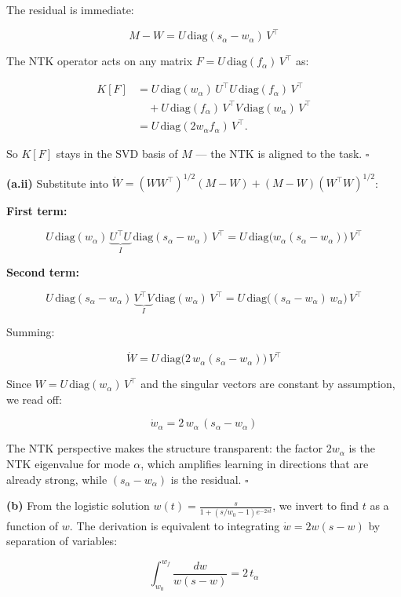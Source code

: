 \documentclass[
]{article}
\begin{document}
The residual is immediate:

\[M - W = U\,\text{diag}(s_\alpha - w_\alpha)\,V^\top\]

The NTK operator acts on any matrix
\(F = U\,\text{diag}(f_\alpha)\,V^\top\) as:

\[
\begin{aligned}
K[F]
&=
U\,\text{diag}(w_\alpha)\,U^\top
U\,\text{diag}(f_\alpha)\,V^\top \\
&\quad
+ U\,\text{diag}(f_\alpha)\,V^\top
V\,\text{diag}(w_\alpha)\,V^\top \\
&=
U\,\text{diag}(2w_\alpha f_\alpha)\,V^\top.
\end{aligned}
\]

So \(K[F]\) stays in the SVD basis of \(M\) --- the NTK is aligned to
the task. \(\square\)

\textbf{(a.ii)} Substitute into
\(\dot{W} = (WW^\top)^{1/2}(M-W) + (M-W)(W^\top W)^{1/2}\):

\textbf{First term:}

\[U\,\text{diag}(w_\alpha)\,\underbrace{U^\top U}_{I}\,\text{diag}(s_\alpha - w_\alpha)\,V^\top = U\,\text{diag}\big(w_\alpha(s_\alpha - w_\alpha)\big)\,V^\top\]

\textbf{Second term:}

\[U\,\text{diag}(s_\alpha - w_\alpha)\,\underbrace{V^\top V}_{I}\,\text{diag}(w_\alpha)\,V^\top = U\,\text{diag}\big((s_\alpha - w_\alpha)\,w_\alpha\big)\,V^\top\]

Summing:

\[\dot{W} = U\,\text{diag}\big(2\,w_\alpha(s_\alpha - w_\alpha)\big)\,V^\top\]

Since \(W = U\,\text{diag}(w_\alpha)\,V^\top\) and the singular vectors
are constant by assumption, we read off:

\[\boxed{\dot{w}_\alpha = 2\,w_\alpha\,(s_\alpha - w_\alpha)}\]

The NTK perspective makes the structure transparent: the factor
\(2w_\alpha\) is the NTK eigenvalue for mode \(\alpha\), which amplifies
learning in directions that are already strong, while
\((s_\alpha - w_\alpha)\) is the residual. \(\square\)

\textbf{(b)} From the logistic solution
\(w(t) = \frac{s}{1 + (s/w_0 - 1)e^{-2st}}\), we invert to find \(t\) as
a function of \(w\). The derivation is equivalent to integrating
\(\dot{w} = 2w(s-w)\) by separation of variables:

\[\int_{w_0}^{w_f} \frac{dw}{w(s-w)} = 2\,t_\alpha\]
\end{document}
